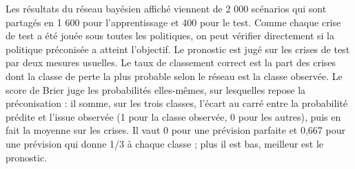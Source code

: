 Les résultats du réseau bayésien affiché viennent de 2 000 scénarios qui sont partagés en 1 600 pour l'apprentissage et 400 pour le test. Comme chaque crise de test a été jouée sous toutes les politiques, on peut vérifier directement si la politique préconisée a atteint l'objectif. Le pronostic est jugé sur les crises de test par deux mesures usuelles. Le taux de classement correct est la part des crises dont la classe de perte la plus probable selon le réseau est la classe observée. Le score de Brier \citep{brier1950} juge les probabilités elles-mêmes, sur lesquelles repose la préconisation : il somme, sur les trois classes, l'écart au carré entre la probabilité prédite et l'issue observée (1 pour la classe observée, 0 pour les autres), puis en fait la moyenne sur les crises. Il vaut 0 pour une prévision parfaite et 0,667 pour une prévision qui donne 1/3 à chaque classe ; plus il est bas, meilleur est le pronostic.
